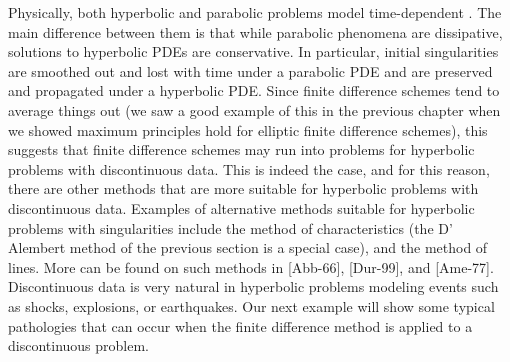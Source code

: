 \documentclass[../main.tex]{subfiles}
\begin{document}
{{Physically, both hyperbolic and parabolic problems model time-dependent 
. The main difference between them is that while parabolic phenomena are dissipative, solutions to hyperbolic PDEs are conservative. In particular, initial singularities are smoothed out and lost with time under a parabolic PDE and are preserved and propagated under a hyperbolic PDE. Since finite difference schemes tend to average things out (we saw a good example of this in the previous chapter when we showed maximum principles hold for elliptic finite difference schemes), this suggests that finite difference schemes may run into problems for hyperbolic problems with discontinuous data. This is indeed the case, and for this reason, there are other methods that are more suitable for hyperbolic problems with discontinuous data. Examples of alternative methods suitable for hyperbolic problems with singularities include the method of characteristics (the D' Alembert method of the previous section is a special case), and the method of lines. More can be found on such methods in [Abb-66], [Dur-99], and [Ame-77]. Discontinuous data is very natural in hyperbolic problems modeling events such as shocks, explosions, or earthquakes. Our next example will show some typical pathologies that can occur when the finite difference method is applied to a discontinuous problem. 
\\
\\
}}
\end{document}
